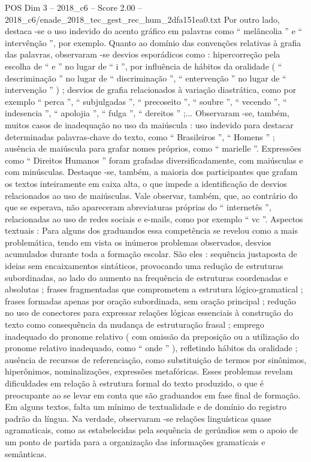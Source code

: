 \begin{textsample}{POS Dim 3 – 2018\_c6 – Score 2.00 – 2018\_c6/enade\_2018\_tec\_gest\_rec\_hum\_2dfa151ea0.txt}
Por outro lado, destaca -se o uso indevido do acento gráfico em palavras como “ melâncolia ” e “ intervênção ”, por exemplo.
Quanto ao domínio das convenções relativas à grafia das palavras, observaram -se desvios esporádicos como : hipercorreção pela escolha de “ e ” no lugar de “ i ”, por influência de hábitos da oralidade ( “ descriminação ” no lugar de “ discriminação ”, “ entervenção ” no lugar de “ intervenção ” ) ; desvios de grafia relacionados à variação diastrática, como por exemplo “ perca ”, “ subjulgadas ”, “ precoseito ”, “ soubre ”, “ vecendo ”, “ indesencia ”, “ apolojia ”, “ fulga ”, “ dereitos ” ;...
Observaram -se, também, muitos casos de inadequação no uso da maiúscula : uso indevido para destacar determinadas palavras-chave do texto, como “ Brasileiros ”, “ Homens ” ; ausência de maiúscula para grafar nomes próprios, como “ marielle ”.
Expressões como “ Direitos Humanos ” foram grafadas diversificadamente, com maiúsculas e com minúsculas.
Destaque -se, também, a maioria dos participantes que grafam os textos inteiramente em caixa alta, o que impede a identificação de desvios relacionados ao uso de maiúsculas.
Vale observar, também, que, ao contrário do que se esperava, não apareceram abreviaturas próprias do “ internetês ”, relacionadas ao uso de redes sociais e e-mails, como por exemplo “ vc ”.
Aspectos textuais : Para alguns dos graduandos essa competência se revelou como a mais problemática, tendo em vista os inúmeros problemas observados, desvios acumulados durante toda a formação escolar.
São eles : sequência justaposta de ideias sem encaixamentos sintáticos, provocando uma redução de estruturas subordinadas, ao lado do aumento na frequência de estruturas coordenadas e absolutas ; frases fragmentadas que comprometem a estrutura lógico-gramatical ; frases formadas apenas por oração subordinada, sem oração principal ; redução no uso de conectores para expressar relações lógicas essenciais à construção do texto como consequência da mudança de estruturação frasal ; emprego inadequado do pronome relativo ( com omissão da preposição ou a utilização do pronome relativo inadequado, como “ onde ” ), refletindo hábitos da oralidade ; ausência de recursos de referenciação, como substituição de termos por sinônimos, hiperônimos, nominalizações, expressões metafóricas.
Esses problemas revelam dificuldades em relação à estrutura formal do texto produzido, o que é preocupante ao se levar em conta que são graduandos em fase final de formação.
Em alguns textos, falta um mínimo de textualidade e de domínio do registro padrão da língua.
Na verdade, observaram -se relações linguísticas quase agramaticais, como as estabelecidas pela sequência de gerúndios sem o apoio de um ponto de partida para a organização das informações gramaticais e semânticas.

\end{textsample}

